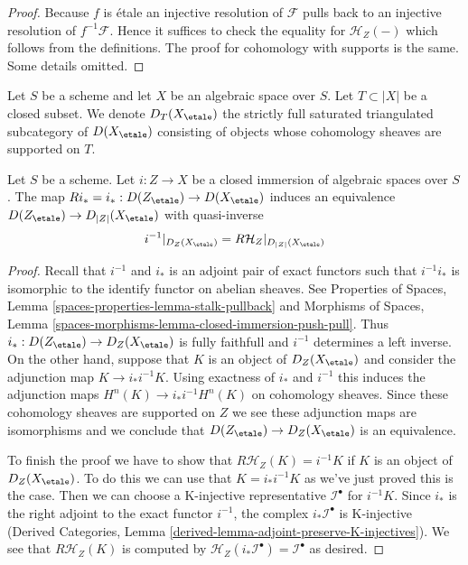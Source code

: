 \begin{proof}
Because $f$ is \'etale an injective resolution of $\mathcal{F}$
pulls back to an injective resolution of $f^{-1}\mathcal{F}$.
Hence it suffices to check the equality for $\mathcal{H}_Z(-)$
which follows from the definitions. The proof for cohomology with
supports is the same. Some details omitted.
\end{proof}

\noindent
Let $S$ be a scheme and let $X$ be an algebraic space over $S$.
Let $T \subset |X|$ be a closed subset.
We denote $D_T(X_\etale)$ the
strictly full saturated triangulated subcategory of $D(X_\etale)$
consisting of objects whose cohomology sheaves are supported on $T$.

\begin{lemma}
\label{lemma-complexes-with-support-on-closed}
Let $S$ be a scheme.
Let $i : Z \to X$ be a closed immersion of algebraic spaces over $S$.
The map $Ri_* = i_* : D(Z_\etale) \to D(X_\etale)$
induces an equivalence $D(Z_\etale) \to D_{|Z|}(X_\etale)$ with quasi-inverse
$$
i^{-1}|_{D_Z(X_\etale)} = R\mathcal{H}_Z|_{D_{|Z|}(X_\etale)}
$$
\end{lemma}

\begin{proof}
Recall that $i^{-1}$ and $i_*$ is an adjoint pair of
exact functors such that $i^{-1}i_*$ is isomorphic to the identify
functor on abelian sheaves. See
Properties of Spaces, Lemma
\ref{spaces-properties-lemma-stalk-pullback} and
Morphisms of Spaces, Lemma
\ref{spaces-morphisms-lemma-closed-immersion-push-pull}.
Thus $i_* : D(Z_\etale) \to D_Z(X_\etale)$ is fully faithfull and
$i^{-1}$ determines
a left inverse. On the other hand, suppose that $K$ is an object of
$D_Z(X_\etale)$ and consider the adjunction map
$K \to i_*i^{-1}K$.
Using exactness of $i_*$ and $i^{-1}$
this induces the adjunction maps
$H^n(K) \to i_*i^{-1}H^n(K)$ on cohomology sheaves.
Since these cohomology
sheaves are supported on $Z$ we see these adjunction maps are isomorphisms
and we conclude that $D(Z_\etale) \to D_Z(X_\etale)$ is an equivalence.

\medskip\noindent
To finish the proof we have to show that $R\mathcal{H}_Z(K) = i^{-1}K$
if $K$ is an object of $D_Z(X_\etale)$. To do this we can use that
$K = i_*i^{-1}K$
as we've just proved this is the case. Then we
can choose a K-injective representative $\mathcal{I}^\bullet$ for
$i^{-1}K$.
Since $i_*$ is the right adjoint to the exact functor
$i^{-1}$, the
complex $i_*\mathcal{I}^\bullet$ is K-injective
(Derived Categories, Lemma \ref{derived-lemma-adjoint-preserve-K-injectives}).
We see that $R\mathcal{H}_Z(K)$ is computed by
$\mathcal{H}_Z(i_*\mathcal{I}^\bullet) = \mathcal{I}^\bullet$
as desired.
\end{proof}






